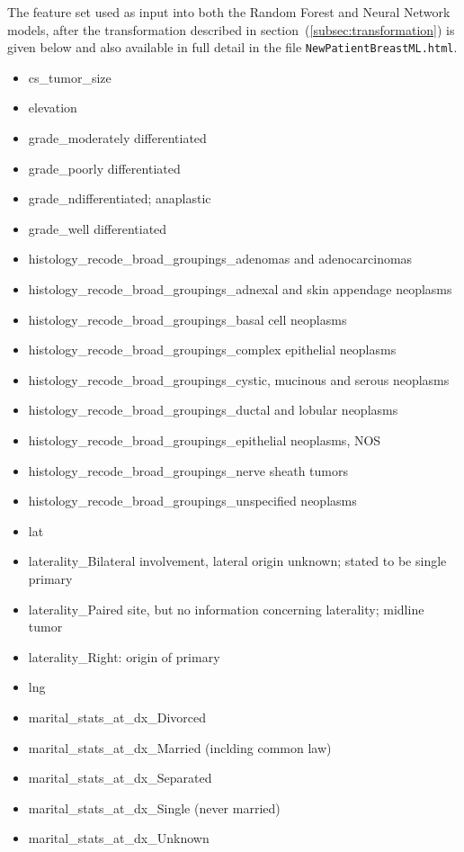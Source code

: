 \documentclass[a4paper,11pt]{article}
\newcommand{\codewhite}[1]{\colorbox{white}{\texttt{#1}}}
\begin{document}
The feature set used as input into both the Random Forest and Neural Network models, after the transformation described in section~(\ref{subsec:transformation}) is given below and also available in full detail in the file 
\codewhite{NewPatientBreastML.html}.

\begin{itemize}[noitemsep]
\item cs\_tumor\_size
\item elevation
\item grade\_moderately differentiated
\item grade\_poorly differentiated
\item grade\_ndifferentiated; anaplastic
\item grade\_well differentiated
\item histology\_recode\_broad\_groupings\_adenomas and adenocarcinomas
\item histology\_recode\_broad\_groupings\_adnexal and skin appendage neoplasms
\item histology\_recode\_broad\_groupings\_basal cell neoplasms
\item histology\_recode\_broad\_groupings\_complex epithelial neoplasms
\item histology\_recode\_broad\_groupings\_cystic, mucinous and serous neoplasms
\item histology\_recode\_broad\_groupings\_ductal and lobular neoplasms
\item histology\_recode\_broad\_groupings\_epithelial neoplasms, NOS
\item histology\_recode\_broad\_groupings\_nerve sheath tumors
\item histology\_recode\_broad\_groupings\_unspecified neoplasms
\item lat
\item laterality\_Bilateral involvement, lateral origin unknown; stated to be single primary
\item laterality\_Paired site, but no information concerning laterality; midline tumor
\item laterality\_Right: origin of primary
\item lng
\item marital\_stats\_at\_dx\_Divorced
\item marital\_stats\_at\_dx\_Married (inclding common law)
\item marital\_stats\_at\_dx\_Separated
\item marital\_stats\_at\_dx\_Single (never married)
\item marital\_stats\_at\_dx\_Unknown

\end{itemize}
\end{document}

